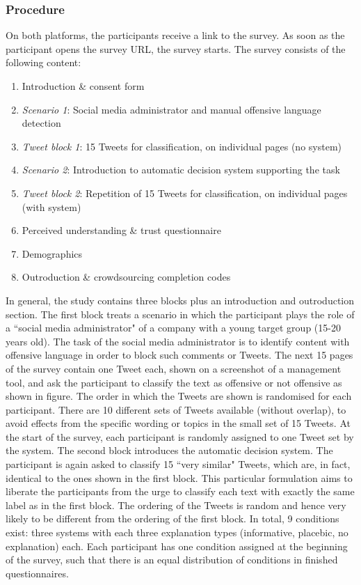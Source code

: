 \subsubsection{Procedure}
On both platforms, the participants receive a link to the survey. As soon as the participant opens the survey URL, the survey starts. The survey consists of the following content:
\begin{enumerate}
	\item Introduction \& consent form
	\item \textit{Scenario 1}: Social media administrator and manual offensive language detection
	\item \textit{Tweet block 1}: 15 Tweets for classification, on individual pages (no system)
	\item \textit{Scenario 2}: Introduction to automatic decision system supporting the task
	\item \textit{Tweet block 2}: Repetition of 15 Tweets for classification, on individual pages (with system)
	\item Perceived understanding \& trust questionnaire
	\item Demographics
	\item Outroduction \& crowdsourcing completion codes
\end{enumerate}
In general, the study contains three blocks plus an introduction and outroduction section. The first block treats a scenario in which the participant plays the role of a ``social media administrator" of a company with a young target group (15-20 years old). The task of the social media administrator is to identify content with offensive language in order to block such comments or Tweets. The next 15 pages of the survey contain one Tweet each, shown on a screenshot of a management tool, and ask the participant to classify the text as offensive or not offensive as shown in figure. The order in which the Tweets are shown is randomised for each participant. There are 10 different sets of Tweets available (without overlap), to avoid effects from the specific wording or topics in the small set of 15 Tweets. At the start of the survey, each participant is randomly assigned to one Tweet set by the system.\newline
The second block introduces the automatic decision system. The participant is again asked to classify 15 ``very similar" Tweets, which are, in fact, identical to the ones shown in the first block. This particular formulation aims to liberate the participants from the urge to classify each text with exactly the same label as in the first block. The ordering of the Tweets is random and hence very likely to be different from the ordering of the first block. In total, 9 conditions exist: three systems with each three explanation types (informative, placebic, no explanation) each. Each participant has one condition assigned at the beginning of the survey, such that there is an equal distribution of conditions in finished questionnaires. \newline
